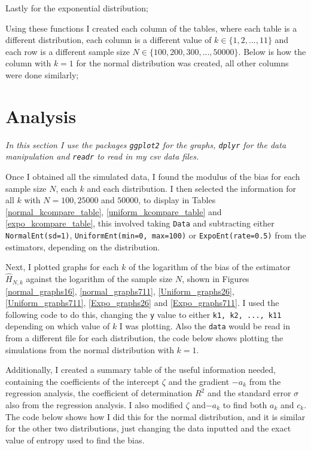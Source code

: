 \documentclass{report}
\begin{document}


Lastly for the exponential distribution;



Using these functions I created each column of the tables, where each table is a different distribution, each column is a different value of $k \in \{1, 2, ..., 11\}$ and each row is a different sample size $N \in \{100, 200, 300, ..., 50000\}$. Below is how the column with $k=1$ for the normal distribution was created, all other columns were done similarly;




\section{Analysis}

\textit{In this section I use the packages \texttt{ggplot2} for the graphs, \texttt{dplyr} for the data manipulation and \texttt{readr} to read in my csv data files.}

Once I obtained all the simulated data, I found the modulus of the bias for each sample size $N$, each $k$ and each distribution. I then selected the information for all $k$ with $N=100, 25000$ and $50000$, to display in Tables \ref{normal_kcompare_table}, \ref{uniform_kcompare_table} and \ref{expo_kcompare_table}, this involved taking \texttt{Data} and subtracting either \texttt{NormalEnt(sd=1)}, \texttt{UniformEnt(min=0, max=100)} or \texttt{ExpoEnt(rate=0.5)} from the estimators, depending on the distribution.

Next, I plotted graphs for each $k$ of the logarithm of the bias of the estimator $\hat{H}_{N, k}$ against the logarithm of the sample size $N$, shown in Figures \ref{normal_graphs16}, \ref{normal_graphs711}, \ref{Uniform_graphs26}, \ref{Uniform_graphs711}, \ref{Expo_graphs26} and \ref{Expo_graphs711}. I used the following code to do this, changing the \texttt{y} value to either \texttt{k1, k2, ..., k11} depending on which value of $k$ I was plotting. Also the \texttt{data} would be read in from a different file for each distribution, the code below shows plotting the simulations from the normal distribution with $k=1$.



Additionally, I created a summary table of the useful information needed, containing the coefficients of the intercept $\zeta$ and the gradient $-a_{k}$ from the regression analysis, the coefficient of determination $R^2$ and the standard error $\sigma$ also from the regression analysis. I also modified $\zeta$ and$-a_{k}$ to find both $a_{k}$ and $c_{k}$. The code below shows how I did this for the normal distribution, and it is similar for the other two distributions, just changing the data inputted and the exact value of entropy used to find the bias.
\end{document}
